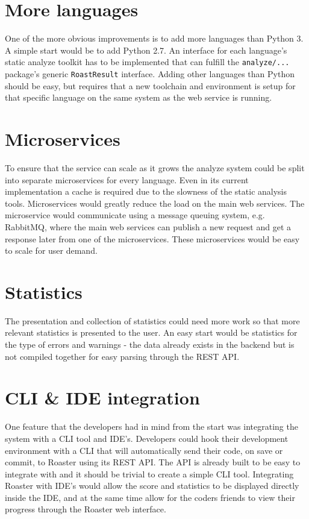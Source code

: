 \documentclass[12pt,a4paper]{report}
\begin{document}
\section{More languages}
One of the more obvious improvements is to add more languages than Python 3. A simple start would be to add Python 2.7. An interface for each language's static analyze toolkit has to be implemented that can fulfill the \texttt{analyze/...} package's generic \texttt{RoastResult} interface. Adding other languages than Python should be easy, but requires that a new toolchain and environment is setup for that specific language on the same system as the web service is running.

\section{Microservices}
To ensure that the service can scale as it grows the analyze system could be split into separate microservices for every language. Even in its current implementation a cache is required due to the slowness of the static analysis tools. Microservices would greatly reduce the load on the main web services. The microservice would communicate using a message queuing system, e.g. RabbitMQ, where the main web services can publish a new request and get a response later from one of the microservices. These microservices would be easy to scale for user demand.

\section{Statistics}
The presentation and collection of statistics could need more work so that more relevant statistics is presented to the user. An easy start would be statistics for the type of errors and warnings - the data already exists in the backend but is not compiled together for easy parsing through the REST API.

\section{CLI \& IDE integration}
One feature that the developers had in mind from the start was integrating the system with a CLI tool and IDE's. Developers could hook their development environment with a CLI that will automatically send their code, on save or commit, to Roaster using its REST API. The API is already built to be easy to integrate with and it should be trivial to create a simple CLI tool. Integrating Roaster with IDE's would allow the score and statistics to be displayed directly inside the IDE, and at the same time allow for the coders friends to view their progress through the Roaster web interface.
\end{document}
